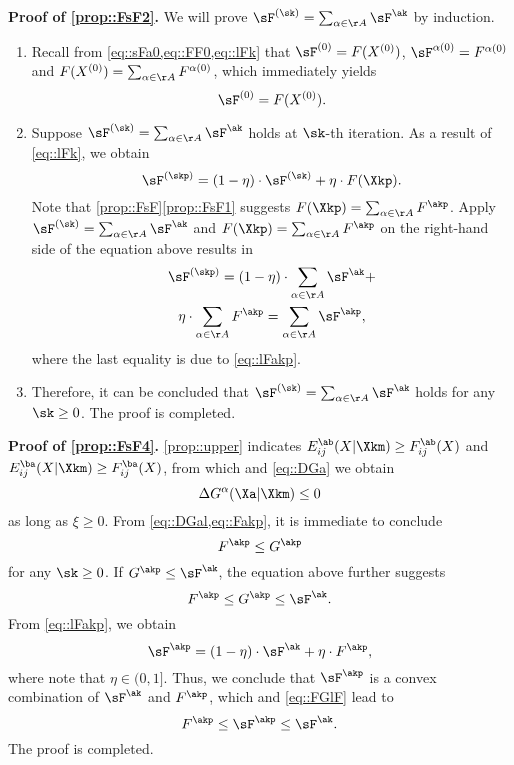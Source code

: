 \noindent\textbf{Proof of \ref{prop::FsF2}.\;} We will prove $\sF^{(\sk)} = \sum_{\alpha\in\AA}\sF^{\ak}$ by induction.
\begin{enumerate}[leftmargin=0.45cm]
\item Recall from \cref{eq::sFa0,eq::FF0,eq::lFk} that $\sF^{(0)}=F(X^{(0)})$, $\sF^{\alpha(0)}=F^{\alpha(0)}$ and $F(X^{(0)})=\sum_{\alpha\in\AA} F^{\alpha(0)}$, which immediately yields
\begin{equation}
\sF^{(0)}=F(X^{(0)}).
\end{equation}
\item Suppose $\sF^{(\sk)}=\sum_{\alpha\in\AA} \sF^{\ak}$ holds at $\sk$-th iteration. As a result of \cref{eq::lFk}, we obtain
\begin{equation}
\nonumber
\sF^{(\skp)} = (1-\eta)\cdot\sF^{(\sk)}+\eta\cdot F(\Xkp).
\end{equation}
Note that \cref{prop::FsF}\ref{prop::FsF1} suggests $F(\Xkp)=\sum_{\alpha\in\AA}F^{\akp}$. Apply $\sF^{(\sk)}=\sum_{\alpha\in\AA} \sF^{\ak}$ and $F(\Xkp)=\sum_{\alpha\in\AA}F^{\akp}$ on the right-hand side of the equation above results in
\begin{multline}
 \sF^{(\skp)}=(1-\eta)\cdot\sum_{\alpha\in\AA}\sF^{\ak} +\\
  \eta\cdot\sum_{\alpha\in\AA}F^{\akp}=\sum_{\alpha\in\AA}\sF^{\akp},
\end{multline}
where the last equality is due to \cref{eq::lFakp}.
\item Therefore, it can be concluded that $\sF^{(\sk)}=\sum_{\alpha\in\AA} \sF^{\ak}$ holds for any $\sk\geq 0$.  The proof is completed.
\end{enumerate}

\vspace{0.5em}

\noindent\textbf{Proof of \ref{prop::FsF4}.\;} \cref{prop::upper} indicates $E_{ij}^{\ab}(X|\Xkm)\geq F_{ij}^{\ab}(X)$ and $E_{ij}^{\ba}(X|\Xkm)\geq F_{ij}^{\ba}(X)$, from which and \cref{eq::DGa} we obtain 
\begin{equation}\label{eq::DGal}
	\Delta G^\alpha(\Xa|\Xkm)\leq 0
\end{equation}
as long as $\xi\geq 0$. From \cref{eq::DGal,eq::Fakp}, it is immediate to conclude 
\begin{equation}
F^{\akp}\leq G^{\akp}
\end{equation}
for any $\sk\geq 0$. If $G^{\akp}\leq \sF^{\ak}$, the equation above further suggests
\begin{equation}\label{eq::FGlF}
F^{\akp}\leq G^{\akp}\leq \sF^{\ak}.
\end{equation}
From \cref{eq::lFakp}, we obtain
\begin{equation}\label{eq::sFakp}
\sF^{\akp} = (1-\eta)\cdot \sF^{\ak} + \eta\cdot F^{\akp},
\end{equation}
where note that $\eta\in(0,1]$. Thus, we conclude that $\sF^{\akp}$ is a convex combination of $\sF^{\ak}$ and $F^{\akp}$, which and \cref{eq::FGlF} lead to
\begin{equation}
F^{\akp}\leq \sF^{\akp}\leq \sF^{\ak}.
\end{equation}
The proof is completed.

